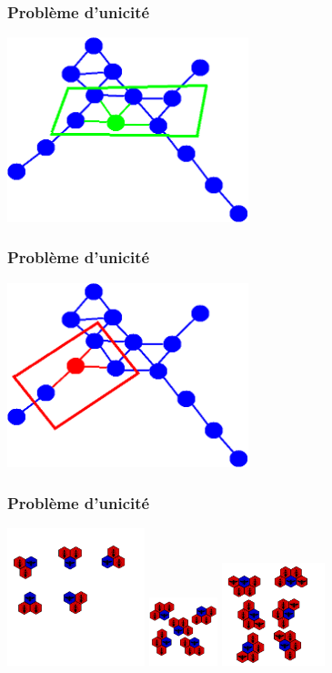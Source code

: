 \documentclass{beamer}
\begin{document}
    \begin{frame}
        \frametitle{Probl\`eme d'unicit\'e}
        \begin{center}
        \includegraphics[width=7cm]{./voisinsConnexe.png}
        \end{center}
    \end{frame}
    \begin{frame}
        \frametitle{Probl\`eme d'unicit\'e}
        \begin{center}
        \includegraphics[width=7cm]{./voisinNonConnexe.png}
        \end{center}
    \end{frame}
    \begin{frame}
        \frametitle{Probl\`eme d'unicit\'e}
        \begin{center}
        \includegraphics[width=4cm]{./2voisins.png}
        \includegraphics[width=2cm]{./3voisins.png}
        \includegraphics[width=3cm]{./4voisins.png}
        \end{center}
    \end{frame}
\end{document}
